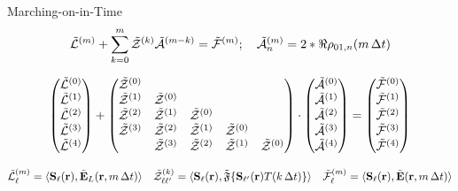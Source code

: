 \documentclass[aspectratio=169]{beamer}
\begin{document}
\begin{frame}
  \begin{block}{Marching-on-in-Time}
    \begin{equation*}
      \tilde{\mathcal{L}}^{(m)} + \sum_{k = 0}^m \tilde{\mathcal{Z}}^{(k)} \tilde{\mathcal{A}}^{(m-k)} = \tilde{\mathcal{F}}^{(m)}; \quad \tilde{\mathcal{A}}^{(m)}_n = 2 * \real{\rho_{01, n}(m \, \Delta t)}
    \end{equation*}
  \end{block}

  \vspace{-0.5cm}
  \begin{equation*}
    \mqty(\tilde{\mathcal{L}}^{(0)} \\ \tilde{\mathcal{L}}^{(1)} \\ \tilde{\mathcal{L}}^{(2)} \\ \tilde{\mathcal{L}}^{(3)} \\ \tilde{\mathcal{L}}^{(4)}) +
    \mqty(
      \tilde{\mathcal{Z}}^{(0)} \\
      \tilde{\mathcal{Z}}^{(1)} & \tilde{\mathcal{Z}}^{(0)} \\
      \tilde{\mathcal{Z}}^{(2)} & \tilde{\mathcal{Z}}^{(1)} & \tilde{\mathcal{Z}}^{(0)} \\
      \tilde{\mathcal{Z}}^{(3)} & \tilde{\mathcal{Z}}^{(2)} & \tilde{\mathcal{Z}}^{(1)} & \tilde{\mathcal{Z}}^{(0)} \\
                                & \tilde{\mathcal{Z}}^{(3)} & \tilde{\mathcal{Z}}^{(2)} & \tilde{\mathcal{Z}}^{(1)} & \tilde{\mathcal{Z}}^{(0)} \\
    ) \cdot
    \mqty(\tilde{\mathcal{A}}^{(0)} \\ \tilde{\mathcal{A}}^{(1)} \\ \tilde{\mathcal{A}}^{(2)} \\ \tilde{\mathcal{A}}^{(3)} \\ \tilde{\mathcal{A}}^{(4)}) =
    \mqty(\tilde{\mathcal{F}}^{(0)} \\ \tilde{\mathcal{F}}^{(1)} \\ \tilde{\mathcal{F}}^{(2)} \\ \tilde{\mathcal{F}}^{(3)} \\ \tilde{\mathcal{F}}^{(4)})
  \end{equation*}

  \vspace{-0.5cm}
  \begin{equation*}
    \tilde{\mathcal{L}}^{(m)}_\ell = \langle\vb{S}_\ell(\vb{r}), \tilde{\vb{E}}_L (\vb{r}, m\, \Delta t)\rangle \quad
    \tilde{\mathcal{Z}}^{(k)}_{\ell\ell'} = \langle\vb{S}_\ell(\vb{r}), \tilde{\mathfrak{F}}\qty{\vb{S}_{\ell'}(\vb{r})T(k \, \Delta t)}\rangle \quad
    \tilde{\mathcal{F}}^{(m)}_\ell = \langle\vb{S}_\ell(\vb{r}), \tilde{\vb{E}} (\vb{r}, m\, \Delta t)\rangle
  \end{equation*}


\end{frame}
\end{document}
